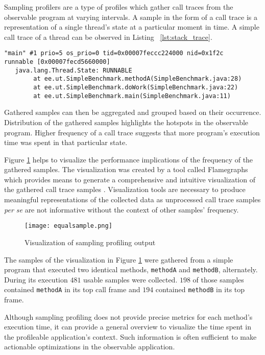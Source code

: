 \documentclass[..thesis.tex]{subfiles}
\begin{document}
Sampling profilers are a type of profiles which gather call traces from the observable program at varying intervals. A sample in the form of a call trace is a representation of a single thread's state at a particular moment in time. A simple call trace of a thread can be observed in Listing ~\ref{lst:stack_trace}. 

\begin{lstlisting}[style=def,label={lst:stack_trace}, caption={Call trace of a thread}]
"main" #1 prio=5 os_prio=0 tid=0x00007feccc224000 nid=0x1f2c 
runnable [0x00007fecd5660000]
   java.lang.Thread.State: RUNNABLE
	    at ee.ut.SimpleBenchmark.methodA(SimpleBenchmark.java:28)
    	at ee.ut.SimpleBenchmark.doWork(SimpleBenchmark.java:22)
	    at ee.ut.SimpleBenchmark.main(SimpleBenchmark.java:11)
\end{lstlisting}

Gathered samples can then be aggregated and grouped based on their occurrence.
Distribution of the gathered samples highlights the hotspots in the observable program. Higher frequency of a call trace suggests that more program's execution time was spent in that particular state. 

Figure \ref{fig:samplingProf} helps to visualize the performance implications of the frequency of the gathered samples. The visualization was created by a tool called Flamegraphs which provides means to generate a comprehensive and intuitive visualization of the gathered call trace samples \cite{gregg_flame}. Visualization tools are necessary to produce meaningful representations of the collected data as unprocessed call trace samples \textit{per se} are not informative without the context of other samples' frequency.

\begin{figure}[H]
\texttt{[image: equalsample.png]}
\caption{Visualization of sampling profiling output}
\label{fig:samplingProf}
\end{figure}

The samples of the visualization in Figure \ref{fig:samplingProf} were gathered from a simple program that executed two identical methods, \texttt{methodA} and \texttt{methodB}, alternately. During its execution $481$ usable samples were collected. $198$ of those samples contained \texttt{methodA} in its top call frame and $194$ contained \texttt{methodB} in its top frame.

Although sampling profiling does not provide precise metrics for each method's execution time, it can provide a general overview to visualize the time spent in the profileable application's context. Such information is often sufficient to make actionable optimizations in the observable application.
\end{document}
